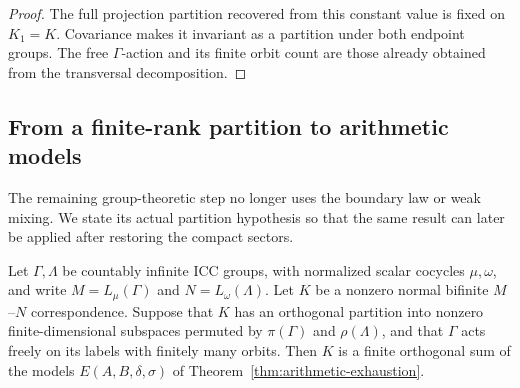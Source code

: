 \begin{proof}
The full projection partition recovered from this constant value is
fixed on $K_1=K$.  Covariance makes it invariant as a partition under
both endpoint groups.  The free $\Gamma$-action and its finite orbit
count are those already obtained from the transversal decomposition.
\end{proof}

\subsection{From a finite-rank partition to arithmetic models}

The remaining group-theoretic step no longer uses the boundary law or
weak mixing.  We state its actual partition hypothesis so that the same
result can later be applied after restoring the compact sectors.

\begin{proposition}
\label{prop:recovery-graph-model}
Let $\Gamma,\Lambda$ be countably infinite ICC groups, with normalized
scalar cocycles $\mu,\omega$, and write $M=L_\mu(\Gamma)$ and
$N=L_\omega(\Lambda)$.  Let $K$ be a nonzero normal bifinite
$M$--$N$ correspondence.  Suppose that
$K$ has an orthogonal partition into nonzero finite-dimensional subspaces
permuted by $\pi(\Gamma)$ and $\rho(\Lambda)$, and that $\Gamma$ acts
freely on its labels with finitely many orbits.  Then $K$ is a finite
orthogonal sum of the models $E(A,B,\delta,\sigma)$ of
Theorem~\ref{thm:arithmetic-exhaustion}.
\end{proposition}

